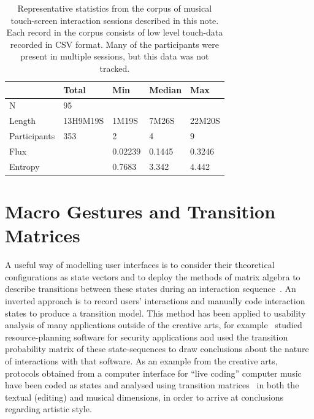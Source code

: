 \documentclass{sigchi}
\begin{document}
\begin{table}
\centering
\begin{tabular}{l|llll}
\hline
            & Total & Min  & Median   & Max     \\ 
\hline
N           & 95    &      &          &         \\
Length & 13H9M19S & 1M19S & 7M26S & 22M20S \\
Participants& 353   & 2    & 4        & 9        \\
Flux &   & 0.02239 & 0.1445 & 0.3246\\
Entropy &   & 0.7683 & 3.342 & 4.442\\          
\hline
\end{tabular}
\caption{
  Representative statistics from the corpus of musical touch-screen
  interaction sessions described in this note.  Each record in the corpus
  consists of low level touch-data recorded in CSV format. 
  Many of the participants were
  present in multiple sessions, but this data was not tracked.\label{corpus-table}}
\end{table}

\section{Macro Gestures and Transition Matrices}

A useful way of modelling user interfaces is to consider their
theoretical configurations as state vectors and to deploy the methods
of matrix algebra to describe transitions between these states during
an interaction sequence~\cite{Thimbleby:2001kq, Thimbleby:2004fj}. An
inverted approach is to record users' interactions and manually code
interaction states to produce a transition model. This method has been
applied to usability analysis of many applications outside of the creative arts, for example~\cite{Kannampallil:2007fp}
studied resource-planning software for
security applications and used the transition
probability matrix of these state-sequences to draw
conclusions about the nature of interactions with that software. As an example from the creative
arts, protocols obtained from a computer interface for ``live coding''
computer music have been  coded as states and analysed using
transition matrices~\cite{Swift:2014tya} in both the textual (editing) and
musical dimensions, in order to arrive at conclusions regarding
artistic style.
\end{document}
